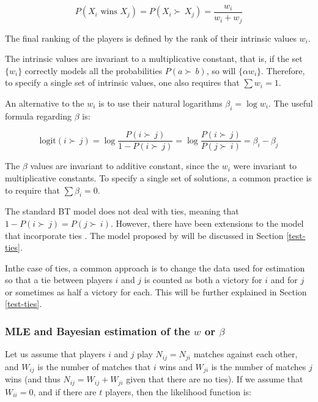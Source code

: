 \documentclass[twoside,11pt,preprint]{article}
\begin{document}
\[ P(X_i \mbox{ wins } X_j) = P(X_i \succ\,X_j) = \frac{w_i}{w_i + w_j} \]

The final ranking of the players is defined by the rank of their
intrinsic values \(w_i\).

The intrinsic values are invariant to a multiplicative constant, that
is, if the set \(\{w_i\}\) correctly models all the probabilities \(P(a \succ\,b)\), so will \(\{\alpha w_i\}\). Therefore, to specify a single
set of intrinsic values, one also requires that \(\sum w_i = 1\).

An alternative to the \(w_i\) is to use their natural logarithms \(\beta_i = \log w_i\).
The useful formula regarding \(\beta\) is:

\begin{equation*}
\mbox{logit}(i \succ\,j) = \log \frac{P(i \succ\,j)}{1-P(i \succ\,j)} = \log \frac{P(i \succ\,j)}{P(j \succ\,i)} = \beta_i - \beta_j 
\end{equation*}

The \(\beta\) values are invariant to additive constant, since the \(w_i\)
were invariant to multiplicative constants. To specify a single set of solutions, a common practice is to require that \(\sum \beta_i = 0\).

The standard BT model does not deal with ties, meaning that \(1 - P(i \succ\,j) = P(j \succ\,i)\). However, there have been extensions to the model that incorporate ties \citep{rao1967ties, davidson1970extending, baker2021modifying}. The model proposed by \citet{davidson1970extending} will be discussed in Section \ref{test-ties}.

Inthe case of ties, a common approach is to change the data used for estimation so that a tie between players \(i\) and \(j\) is counted as both a victory for \(i\) and for \(j\) or sometimes as half a victory for each. This will be further explained in Section \ref{test-ties}.

\hypertarget{mle-and-bayesian-estimation-of-the-w-or-beta}{%
\subsubsection{\texorpdfstring{MLE and Bayesian estimation of the \(w\) or \(\beta\) \label{sec:bayesbt}}{MLE and Bayesian estimation of the w or \textbackslash beta }}\label{mle-and-bayesian-estimation-of-the-w-or-beta}}

Let us assume that players \(i\) and \(j\) play \(N_{ij}= N_{ji}\) matches against each other,
and \(W_{ij}\) is the number of matches that \(i\) wins and \(W_{ji}\) is
the number of matches \(j\) wins (and thus \(N_{ij} = W_{ij} + W_{ji}\)
given that there are no ties). If we assume that \(W_{ii} = 0\), and if
there are \(t\) players, then the likelihood function is:
\end{document}
